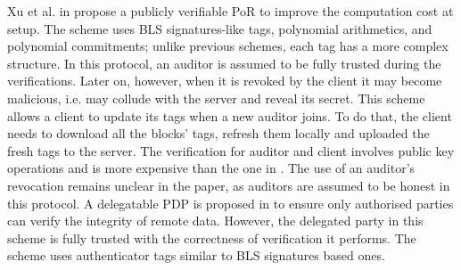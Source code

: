 Xu et al. in \cite{xu2016lightweight} propose a publicly verifiable PoR to improve the computation cost at setup. The scheme uses   BLS signatures-like tags, polynomial arithmetics, and polynomial commitments; unlike previous schemes,  each tag has a more complex structure.  In this protocol, an auditor is assumed to be fully trusted during the verifications. Later on, however, when  it is revoked by the client it may become malicious, i.e. may collude with the server and reveal its secret. This scheme allows a client to update its tags when a new auditor joins. To do that, the client needs to download all the blocks' tags, refresh them locally and uploaded the fresh tags to the server. The verification for auditor and client involves public key operations and is more expensive than the one in \cite{armknecht2014outsourced}. The use of an auditor's revocation remains unclear in the paper, as  auditors are assumed to be honest in this protocol. A delegatable PDP is proposed in \cite{ShenT11} to ensure only authorised parties can verify the integrity of remote data. However, the delegated party in this scheme is fully trusted with the correctness of verification it performs. The scheme uses authenticator tags  similar to   BLS signatures based ones.


